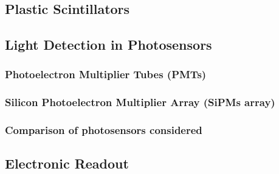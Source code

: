 \documentclass[12pt,a4paper]{book}
\begin{document}
		\subsection{Plastic Scintillators} \label{subsec:PlasticScintillators}
		
		
			
		\subsection{Light Detection in Photosensors}\label{subsec:Photosensors}
		
	
			\subsubsection{Photoelectron Multiplier Tubes (PMTs)}\label{subsubsec:PMTs}
			
		
			\subsubsection{Silicon Photoelectron Multiplier Array (SiPMs array)}\label{subsubsec:SiPM}
			
			
			\subsubsection[Comparison Photosensors]{Comparison of photosensors considered}\label{subsubsec:ComparisonPhotosensors}
			
					
		\subsection{Electronic Readout}\label{subsec:IntroductionElectronicalSystem}
			
	
\end{document}

